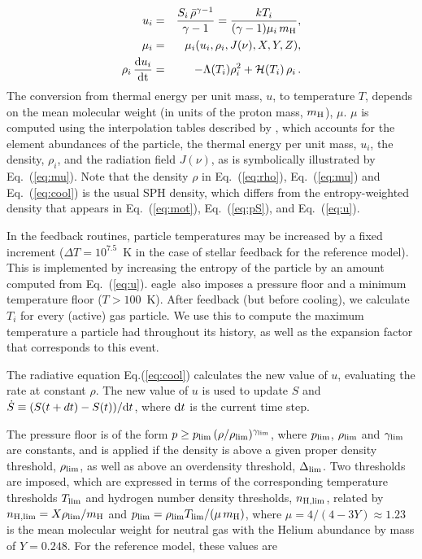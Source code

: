 \documentclass[10pt, a4paper]{article}
\newcommand{\eagle}{{\sc eagle}}
\begin{document}
\begin{eqnarray}
\label{eq:u}
u_i &=& {S_i\,\bar{\rho}^{\gamma-1}\over \gamma-1} = {kT_i\over (\gamma-1)\mu_i\,m_{\rm H}},\\
\label{eq:mu}
\mu_i &=& \mu_i(u_i, \rho_i, J(\nu), X, Y, Z),\\
\label{eq:cool}
\rho_i\,{{\rm d}u_i\over {\rm dt}} &=& -\Lambda(T_i)\rho_i^2+{\cal H}(T_i)\,\rho_i\,.
\end{eqnarray}
The conversion from thermal energy per unit mass, $u$, to temperature $T$,
depends on the mean molecular weight (in units of the proton mass, $m_{\rm
H}$), $\mu$. $\mu$ is computed using the interpolation tables described by
\cite{Wiersma09a}, which accounts for the element abundances of the particle,
the thermal energy per unit mass, $u_i$, the density, $\rho_i$, and the
radiation field $J(\nu)$, as is symbolically illustrated by Eq.~(\ref{eq:mu}).
Note that the density $\rho$ in Eq.~(\ref{eq:rho}), Eq.~(\ref{eq:mu}) and
Eq.~(\ref{eq:cool}) is the usual SPH density, which differs from the
entropy-weighted density that appears in Eq.~(\ref{eq:mot}), Eq.~(\ref{eq:pS}),
and Eq.~(\ref{eq:u}).

In the feedback routines, particle temperatures may be increased by a fixed
increment ($\Delta T=10^{7.5}$~K in the case of stellar feedback for the {\sc
reference model}). This is implemented by increasing the entropy of the particle
by an amount computed from Eq.~(\ref{eq:u}). \eagle\ also imposes a pressure
floor and a minimum temperature floor ($T>100$~K). After feedback (but before
cooling), we calculate $T_i$ for every (active) gas particle. We use this to
compute the maximum temperature a particle had throughout its history, as well
as the expansion factor that corresponds to this event.

The radiative equation Eq.(\ref{eq:cool}) calculates the new value of $u$,
evaluating the rate at constant $\rho$. The new value of $u$ is used to update
$S$ and $\dot S\equiv (S(t+dt)-S(t))/{\rm d}t$, where ${\rm d}t$ is the current
time step.

The pressure floor is of the form $p\ge p_{\rm lim}\,(\rho/\rho_{\rm
lim})^{\gamma_{\rm lim}}$,  where $p_{\rm lim}$, $\rho_{\rm lim}$ and
$\gamma_{\rm lim}$ are constants, and is applied if the density is above a
given proper density threshold, $\rho_{\rm lim}$, as well as above an
overdensity threshold, $\Delta_{\rm lim}$. Two thresholds are imposed, which
are expressed in terms of the corresponding temperature thresholds $T_{\rm
lim}$ and hydrogen number density thresholds, $n_{\rm H, lim}$, related by
$n_{\rm H, lim}=X\rho_{\rm lim}/m_{\rm H}$ and $p_{\rm lim}=\rho_{\rm
lim}T_{\rm lim}/(\mu\,m_{\rm H})$, where $\mu=4/(4-3Y)\approx 1.23$ is the mean
molecular weight for neutral gas with the \cite{Planck13} Helium abundance by
mass of $Y=0.248$. For the {\sc reference model}, these values are
\end{document}
